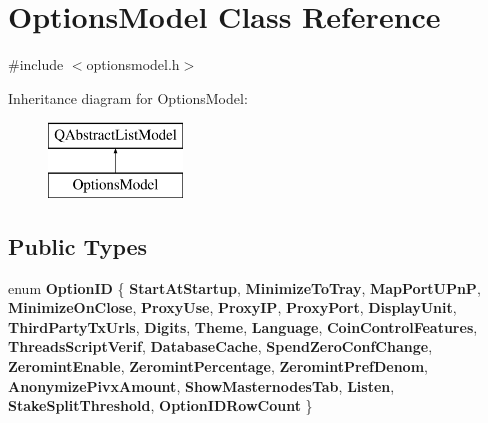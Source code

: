 \hypertarget{class_options_model}{}\section{Options\+Model Class Reference}
\label{class_options_model}


{\ttfamily \#include $<$optionsmodel.\+h$>$}

Inheritance diagram for Options\+Model\+:\begin{figure}[H]
\begin{center}
\leavevmode
\includegraphics[height=2.000000cm]{class_options_model}
\end{center}
\end{figure}
\subsection*{Public Types}
\begin{DoxyCompactItemize}
\item 
\mbox{\label{class_options_model_a5c6c9ca8a01aca9f53e91f118e4878d2}} 
enum {\bfseries Option\+ID} \{ \newline
{\bfseries Start\+At\+Startup}, 
{\bfseries Minimize\+To\+Tray}, 
{\bfseries Map\+Port\+U\+PnP}, 
{\bfseries Minimize\+On\+Close}, 
\newline
{\bfseries Proxy\+Use}, 
{\bfseries Proxy\+IP}, 
{\bfseries Proxy\+Port}, 
{\bfseries Display\+Unit}, 
\newline
{\bfseries Third\+Party\+Tx\+Urls}, 
{\bfseries Digits}, 
{\bfseries Theme}, 
{\bfseries Language}, 
\newline
{\bfseries Coin\+Control\+Features}, 
{\bfseries Threads\+Script\+Verif}, 
{\bfseries Database\+Cache}, 
{\bfseries Spend\+Zero\+Conf\+Change}, 
\newline
{\bfseries Zeromint\+Enable}, 
{\bfseries Zeromint\+Percentage}, 
{\bfseries Zeromint\+Pref\+Denom}, 
{\bfseries Anonymize\+Pivx\+Amount}, 
\newline
{\bfseries Show\+Masternodes\+Tab}, 
{\bfseries Listen}, 
{\bfseries Stake\+Split\+Threshold}, 
{\bfseries Option\+I\+D\+Row\+Count}
 \}
\end{DoxyCompactItemize}
